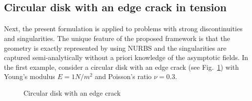 \subsection{Circular disk with an edge crack in tension}

\paragraph{}
Next, the present formulation is applied to problems with strong discontinuities and singularities.
The unique feature of the proposed framework is that the geometry is exactly represented by using NURBS and the singularities are captured semi-analytically without a priori knowledge of the asymptotic fields.
In the first example, consider a circular disk with an edge crack (see Fig.~\ref{iso_fig:circular_disk_geo_bc}) with Young’s modulus $E=1N/m^2$ and Poisson's ratio $\nu=0.3$.
    \begin{figure}[h!]
        \centering
        \caption{Circular disk with an edge crack}
        \label{iso_fig:circular_disk_geo_bc}
    \end{figure}

